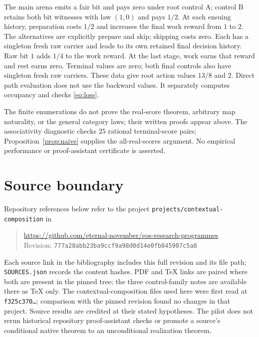 \documentclass[11pt]{article}
\theoremstyle{definition}
\newcommand{\reporev}{777a28abb23ba9ccf9a98d0d14e0fb845907c5a8}
\begin{document}
The main arena emits a fair bit and pays zero under root control A; control B retains
both bit witnesses with law \((1,0)\) and pays \(1/2\). At each ensuing
history, preparation costs \(1/2\) and increases the final work reward from
\(1\) to \(2\). The alternatives are explicitly \(\mathrm{prepare}\) and
\(\mathrm{skip}\); skipping costs zero. Each has a singleton fresh raw
carrier and leads to its own retained final decision history.
Raw bit \(1\) adds \(1/4\) to the work reward. At the last
stage, work earns that reward and rest earns zero. Terminal values are
zero; both final controls also have singleton fresh raw carriers.
These data give root action values \(13/8\) and \(2\).
Direct path evaluation does not use the backward values. It separately
computes occupancy and checks \eqref{eq:loss}.

The finite enumerations do not prove the real-score theorem, arbitrary
map naturality, or the general category laws; their written proofs appear
above. The associativity diagnostic checks \(25\) rational terminal-score
pairs; Proposition~\ref{prop:naive} supplies the all-real-scores argument.
No empirical performance or proof-assistant certificate is asserted.

\section{Source boundary}
Repository references below refer to the project
\texttt{projects/contextual-composition} in
\begin{quote}
\url{https://github.com/eternal-november/eos-research-programmes}\\
Revision: \texttt{\reporev}
\end{quote}
Each source link in the bibliography includes this full revision and its
file path; \texttt{SOURCES.json} records the content hashes.
PDF and TeX links are paired where both are present in the pinned tree;
the three control-family notes are available there as TeX only.
The contextual-composition files used here
were first read at \texttt{f325c370\ldots}; comparison with the pinned
revision found no changes in that project. Source results are credited
at their stated hypotheses. The pilot does not rerun historical repository
proof-assistant checks or promote a source's conditional native theorem
to an unconditional realization theorem.
\end{document}
